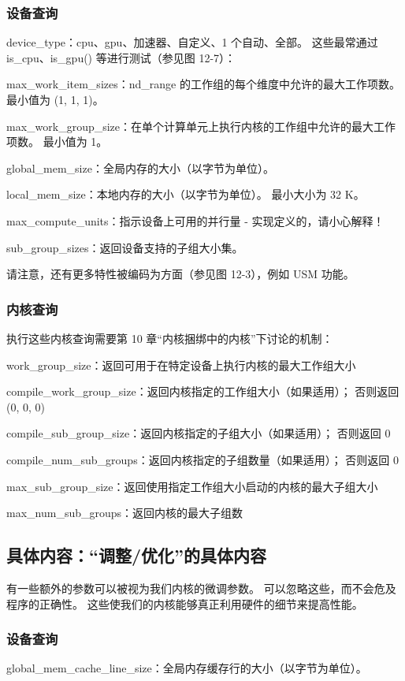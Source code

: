 \subsubsection{设备查询}
device\_type：cpu、gpu、加速器、自定义、1 个自动、全部。 这些最常通过 is\_cpu、is\_gpu() 等进行测试（参见图 12-7）：

max\_work\_item\_sizes：nd\_range 的工作组的每个维度中允许的最大工作项数。 最小值为 (1, 1, 1)。

max\_work\_group\_size：在单个计算单元上执行内核的工作组中允许的最大工作项数。 最小值为 1。

global\_mem\_size：全局内存的大小（以字节为单位）。

local\_mem\_size：本地内存的大小（以字节为单位）。 最小大小为 32 K。

max\_compute\_units：指示设备上可用的并行量 - 实现定义的，请小心解释！

sub\_group\_sizes：返回设备支持的子组大小集。

请注意，还有更多特性被编码为方面（参见图 12-3），例如 USM 功能。

\subsubsection{内核查询}
执行这些内核查询需要第 10 章“内核捆绑中的内核”下讨论的机制：

work\_group\_size：返回可用于在特定设备上执行内核的最大工作组大小

compile\_work\_group\_size：返回内核指定的工作组大小（如果适用）； 否则返回 (0, 0, 0)

compile\_sub\_group\_size：返回内核指定的子组大小（如果适用）； 否则返回 0

compile\_num\_sub\_groups：返回内核指定的子组数量（如果适用）； 否则返回 0

max\_sub\_group\_size：返回使用指定工作组大小启动的内核的最大子组大小

max\_num\_sub\_groups：返回内核的最大子组数

\subsection{具体内容：“调整/优化”的具体内容}
有一些额外的参数可以被视为我们内核的微调参数。 可以忽略这些，而不会危及程序的正确性。 这些使我们的内核能够真正利用硬件的细节来提高性能。

\subsubsection{设备查询}
global\_mem\_cache\_line\_size：全局内存缓存行的大小（以字节为单位）。

